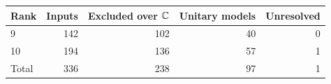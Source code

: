 \begin{center}
\begin{tabular}{lrrrr}
\toprule Rank & Inputs & Excluded over $\mathbb C$ & Unitary models & Unresolved \\
\midrule
9 & 142 & 102 & 40 & 0 \\
10 & 194 & 136 & 57 & 1 \\
Total & 336 & 238 & 97 & 1 \\
\bottomrule
\end{tabular}
\end{center}
